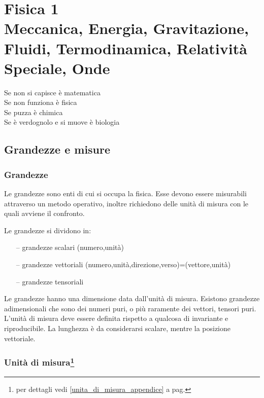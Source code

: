 \part[Fisica 1]{Fisica 1\\\vspace{1cm}\large{Meccanica, Energia, Gravitazione, Fluidi, Termodinamica, Relatività Speciale, Onde}}


\begin{savequote}
Se non si capisce è matematica\\
Se non funziona è fisica\\
Se puzza è chimica\\
Se è verdognolo e si muove è biologia\\
\end{savequote}
\chapter{Grandezze e misure}
\section{Grandezze}
Le grandezze sono enti di cui si occupa la fisica. Esse devono essere misurabili attraverso un metodo operativo, inoltre richiedono delle unità di misura con le quali avviene il confronto.
\newline\par
Le grandezze si dividono in:
\begin{enumerate}
\item[--] grandezze scalari (numero,unità)
\item[--] grandezze vettoriali
(numero,unità,direzione,verso)=(vettore,unità)
\item[--] grandezze tensoriali
\end{enumerate}
Le grandezze hanno una dimensione data dall'unità di misura. Esistono grandezze adimensionali che sono dei numeri puri, o più raramente dei vettori, tensori puri. L'unità di misura deve essere definita rispetto a qualcosa di invariante e riproducibile. La lunghezza è da considerarsi scalare, mentre la posizione vettoriale.
\section[Unità di misura]{Unità di misura\protect\footnote{per dettagli vedi \ref{unita_di_misura_appendice} a pag.\@\pageref{unita_di_misura_appendice}}}
